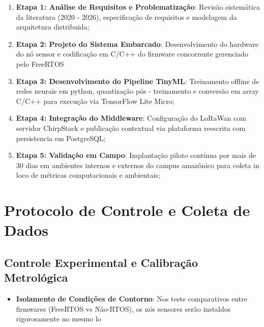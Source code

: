 \begin{enumerate}
    \item \textbf{Etapa 1: Análise de Requisitos e Problematização}: Revisão sistemática da literatura
                                                                     (2020 - 2026), especificação de requisitos e modelagem da 
                                                                     arquitetura distribuida;
    \item \textbf{Etapa 2: Projeto do Sistema Embarcado}: Desenvolvimento do hardware do nó sensor e codificação
                                                          em C/C++ do firmware concorrente gerenciado pelo FreeRTOS
    \item \textbf{Etapa 3: Desenvolvimento do Pipeline TinyML}: Treinamento offline de redes neurais
                                                                em python, quantização pós - treinamento e conversão em array C/C++
                                                                para execução via TensorFlow Lite Micro;
    \item \textbf{Etapa 4: Integração do Middleware}: Configuração do LoRaWan com servidor ChirpStack e publicação contextual via plataforma reescrita
                                                      com persistencia em PostgreSQL;
    \item \textbf{Etapa 5: Validação em Campo}: Implantação piloto contínua por mais de 30 dias 
                                                em ambientes internos e externos do campus amazônico para coleta in loco
                                                de métricas computacionais e ambientais;
\end{enumerate}



\section{Protocolo de Controle e Coleta de Dados}
\subsection{Controle Experimental e Calibração Metrológica}
\begin{itemize}
    \item \textbf{Isolamento de Condições de Contorno}: Nos teste comparativos entre firmwares 
                                                        (FreeRTOS vs Não-RTOS), os nós sensores serão
                                                        instaldos rigorosamente no mesmo lo
\end{itemize}